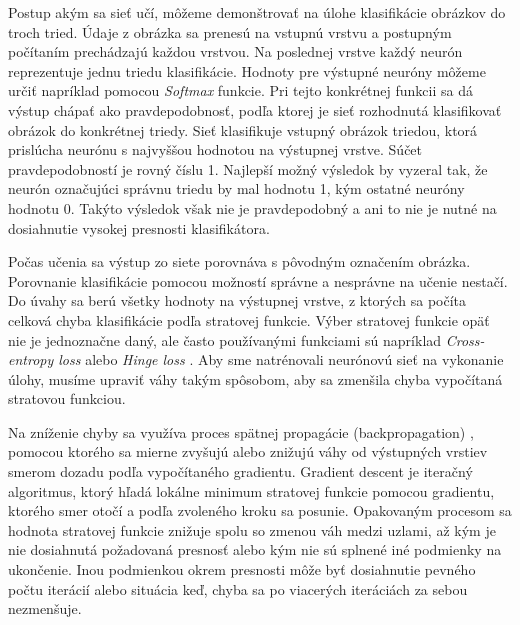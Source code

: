 Postup akým sa sieť učí, môžeme demonštrovať na úlohe klasifikácie obrázkov do troch tried. Údaje z obrázka sa prenesú na vstupnú vrstvu a postupným počítaním prechádzajú každou vrstvou. Na poslednej vrstve každý neurón reprezentuje jednu triedu klasifikácie. Hodnoty pre výstupné neuróny môžeme určiť napríklad pomocou \textit{Softmax} funkcie. Pri tejto konkrétnej funkcii sa dá výstup chápať ako pravdepodobnosť, podľa ktorej je sieť rozhodnutá klasifikovať obrázok do konkrétnej triedy. Sieť klasifikuje vstupný obrázok triedou, ktorá prislúcha neurónu s najvyššou hodnotou na výstupnej vrstve. Súčet pravdepodobností je rovný číslu 1. Najlepší možný výsledok by vyzeral tak, že neurón označujúci správnu triedu by mal hodnotu 1, kým ostatné neuróny hodnotu 0. Takýto výsledok však nie je pravdepodobný a ani to nie je nutné na dosiahnutie vysokej presnosti klasifikátora.

Počas učenia sa výstup zo siete porovnáva s pôvodným označením obrázka. Porovnanie klasifikácie pomocou možností správne a nesprávne na učenie nestačí. Do úvahy sa berú všetky hodnoty na výstupnej vrstve, z ktorých sa počíta celková chyba klasifikácie podľa stratovej funkcie. Výber stratovej funkcie opäť nie je jednoznačne daný, ale často používanými funkciami sú napríklad \textit{Cross-entropy loss} alebo \textit{Hinge loss} \cite{loss}. Aby sme natrénovali neurónovú sieť na vykonanie úlohy, musíme upraviť váhy takým spôsobom, aby sa zmenšila chyba vypočítaná stratovou funkciou. 

Na zníženie chyby sa využíva proces spätnej propagácie (backpropagation) \cite{bp}, pomocou ktorého sa mierne zvyšujú alebo znižujú váhy od výstupných vrstiev smerom dozadu podľa vypočítaného gradientu. Gradient descent je iteračný algoritmus, ktorý hľadá lokálne minimum stratovej funkcie pomocou gradientu, ktorého smer otočí a podľa zvoleného kroku sa posunie. Opakovaným procesom sa hodnota stratovej funkcie znižuje spolu so zmenou váh medzi uzlami, až kým je nie dosiahnutá požadovaná presnosť alebo kým nie sú splnené iné podmienky na ukončenie. Inou podmienkou okrem presnosti môže byť dosiahnutie pevného počtu iterácií alebo situácia keď, chyba sa po viacerých iteráciách za sebou nezmenšuje.

